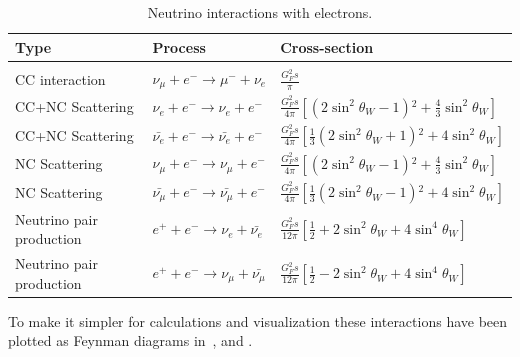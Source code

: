 \begin{table}[h!]
\centering
\caption{Neutrino interactions with electrons.}
\label{tab:electronproc}
\begin{tabular}{|l|l|l|}
 \hline
Type & Process & Cross-section \\
 \hline
& & \\[1pt]
CC interaction & $\nu_\mu + e^- \rightarrow \mu^- + \nu_e$  & $\frac{G_F^2 s}{\pi}$\\[10pt]
CC+NC Scattering & $\nu_e + e^- \rightarrow \nu_e + e^-$ & $\frac{G_F^2 s}{4\pi} \left[ (2\sin^2 \theta_W -1){}^2 +\frac{4}{3}\sin^2 \theta_W \right]$\\[10pt]
CC+NC Scattering & $\bar{\nu_e} + e^- \rightarrow \bar{\nu_e} + e^-$ & $\frac{G_F^2 s}{4\pi} \left[ \frac{1}{3}(2\sin^2 \theta_W +1){}^2 +4\sin^2 \theta_W \right]$ \\[10pt]
NC Scattering & $\nu_\mu + e^- \rightarrow \nu_\mu + e^-$ & $\frac{G_F^2 s}{4\pi} \left[ (2\sin^2 \theta_W -1){}^2 +\frac{4}{3}\sin^2 \theta_W \right]$ \\
NC Scattering & $\bar{\nu_\mu} + e^- \rightarrow \bar{\nu_\mu} + e^-$ &$\frac{G_F^2 s}{4\pi} \left[ \frac{1}{3}(2\sin^2 \theta_W -1){}^2 +4\sin^2 \theta_W \right]$ \\[10pt]
Neutrino pair production & $e^+ + e^- \rightarrow \nu_e + \bar{\nu_e}$ & $\frac{G_F^2 s}{12\pi} \left[ \frac{1}{2} + 2\sin^2 \theta_W + 4\sin^4 \theta_W \right]$ \\[10pt]
Neutrino pair production & $e^+ + e^- \rightarrow \nu_\mu + \bar{\nu_\mu}$ & $\frac{G_F^2 s}{12\pi} \left[ \frac{1}{2} - 2\sin^2 \theta_W + 4\sin^4 \theta_W \right]$ \\[10pt]
 \hline
\end{tabular}
\end{table}

To make it simpler for calculations and visualization these interactions have been plotted as Feynman diagrams in~,  and .

